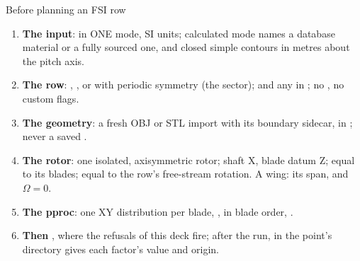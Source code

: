 \begin{frame}{Before planning an FSI row}
\begin{enumerate}\small
  \item \textbf{The input}:  in ONE mode, SI units;
        calculated mode names a database material or a fully sourced one, and
        closed simple contours in metres about the pitch axis.
  \item \textbf{The row}:  , , or
         with periodic symmetry (the sector);
         and any  in
        ; no , no custom flags.
  \item \textbf{The geometry}: a fresh OBJ or STL import with its boundary
        sidecar, in ; never a saved .
  \item \textbf{The rotor}: one isolated, axisymmetric rotor; shaft X, blade
        datum Z;  equal to its blades;
         equal to the row's free-stream rotation. A
        wing: its span, and \(\Omega = 0\).
  \item \textbf{The pproc}: one XY distribution per blade, ,
        in blade order, .
  \item \textbf{Then} , where the refusals of this deck
        fire; after the run,  in the point's directory
        gives each factor's value and origin.
\end{enumerate}
\end{frame}

